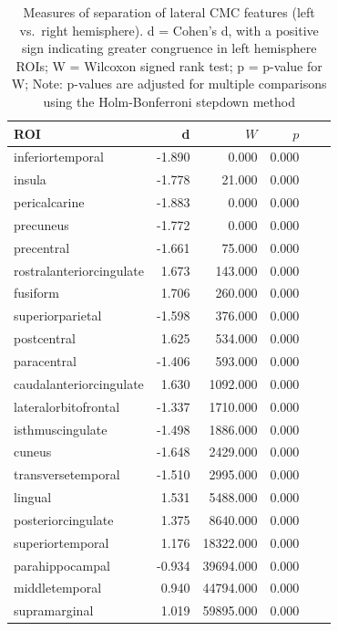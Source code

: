 \documentclass{article}
\begin{document}
\begin{table}
\centering
\caption{Measures of separation of lateral CMC features (left vs.\ right
hemisphere). d = Cohen's d, with a positive sign indicating greater congruence in left hemisphere ROIs;
W = Wilcoxon signed rank test; p = p-value for W;
Note: p-values are adjusted for multiple comparisons using the Holm-Bonferroni stepdown method
} \label{tab:lateral-cmc}
\begin{tabular}{lrrrrr}
	\toprule
	ROI & d &  \(W\) & \(p\) \\
	\midrule
	inferiortemporal         & -1.890 &  0.000       & 0.000 \\
	insula                   & -1.778 &  21.000      & 0.000 \\
	pericalcarine            & -1.883 &  0.000       & 0.000 \\
	precuneus                & -1.772 &  0.000       & 0.000 \\
	precentral               & -1.661 &  75.000      & 0.000 \\
	rostralanteriorcingulate & 1.673  &  143.000     & 0.000 \\
	fusiform                 & 1.706  &  260.000     & 0.000 \\
	superiorparietal         & -1.598 &  376.000     & 0.000 \\
	postcentral              & 1.625  &  534.000     & 0.000 \\
	paracentral              & -1.406 &  593.000     & 0.000 \\
	caudalanteriorcingulate  & 1.630  &  1092.000    & 0.000 \\
	lateralorbitofrontal     & -1.337 &  1710.000    & 0.000 \\
	isthmuscingulate         & -1.498 &  1886.000    & 0.000 \\
	cuneus                   & -1.648 &  2429.000    & 0.000 \\
	transversetemporal       & -1.510 &  2995.000    & 0.000 \\
	lingual                  &  1.531 &  5488.000    & 0.000 \\
	posteriorcingulate       &  1.375 &  8640.000    & 0.000 \\
	superiortemporal         &  1.176 &  18322.000   & 0.000 \\
	parahippocampal          & -0.934 &  39694.000   & 0.000 \\
	middletemporal           &  0.940 &  44794.000   & 0.000 \\
	supramarginal            &  1.019 &  59895.000   & 0.000 \\

\end{tabular}
\end{table}
\end{document}
